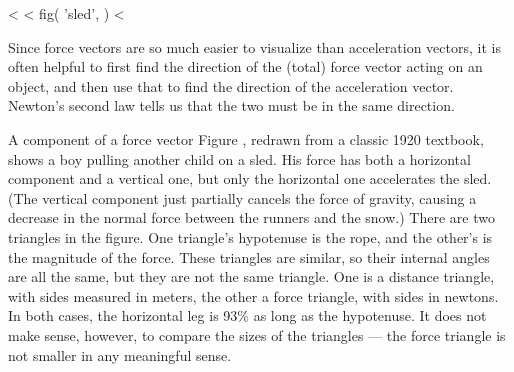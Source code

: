 <%
<%
  fig(
    'sled',
  )
<%

Since force vectors are so much easier to visualize than
acceleration vectors, it is often helpful to first find the
direction of the (total) force vector acting on an object,
and then use that to find the direction of
the acceleration vector. Newton's second law
tells us that the two must be in the same direction.

\begin{eg}{A component of a force vector}\label{eg:sled}
Figure , redrawn from a classic 1920 textbook, shows
a boy pulling another child on a sled. His force has both a horizontal
component and a vertical one, but only the horizontal one accelerates
the sled. (The vertical component just partially cancels the force of gravity,
causing a decrease in the normal force between the runners and the snow.)
There are two triangles in the figure. One triangle's hypotenuse is the
rope, and the other's is the magnitude of the force. These triangles are
similar, so their internal angles are all the same, but they are not the
same triangle. One is a distance triangle, with sides measured in meters, the other
a force triangle, with sides in newtons. In both cases, the horizontal leg
is 93\% as long as the hypotenuse. It does not make sense, however, to
compare the sizes of the triangles --- the force triangle is not smaller
in any meaningful sense.
\end{eg}

